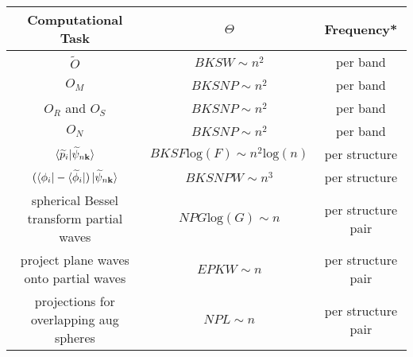 \documentclass[12pt]{article}
\begin{document}
\begin{table}
\centering
\begin{tabular}{|c|c|c|}
\hline
Computational Task & $\Theta$ & Frequency*\\
\hline
$\widetilde{O}$ & $BKSW \sim n^2$ & per band\\
$O_M$ & $BKSNP \sim n^2$ & per band\\
$O_R$ and $O_S$ & $BKSNP \sim n^2$ & per band\\
$O_N$ & $BKSNP \sim n^2$ & per band\\
$\braket{\widetilde{p}_i|\widetilde{\psi}_{n\mathbf{k}}}$ & $BKSF\mathrm{log}(F)
\sim n^2\mathrm{log}(n)$ & per structure\\
$(\bra{\phi_i}-\bra{\widetilde{\phi}_i})
\ket{\widetilde{\psi}_{n\mathbf{k}}}$ & $BKSNPW \sim n^3$ & per structure\\
spherical Bessel transform partial waves & $NPG\mathrm{log}(G) \sim n$ & per structure pair\\
project plane waves onto partial waves & $EPKW \sim n$ & per structure pair\\
projections for overlapping aug spheres & $NPL \sim n$ & per structure pair\\
\hline
\end{tabular}


\end{table}
\end{document}
